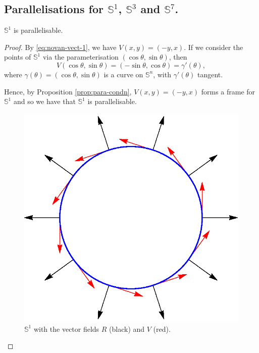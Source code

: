 \documentclass[12pt,a4paper]{article}
\begin{document}
\subsection{Parallelisations for $\mathbb{S}^1$, $\mathbb{S}^3$ and $\mathbb{S}^7$.}
\begin{proposition}
$\mathbb{S}^1$ is parallelisable.
\end{proposition}
\begin{proof}
By \eqref{eq:novan-vect-1}, we have $V(x,y)=(-y,x)$. If we consider the points of $\mathbb{S}^1$ via the parameterisation $(\cos\theta,\sin\theta)$, then
\[
V(\cos\theta,\sin\theta)=(-\sin\theta,\cos\theta)=\gamma'(\theta),
\] 
where $\gamma(\theta)=(\cos\theta,\sin\theta)$ is a curve on $\mathbb{S}^n$, with $\gamma'(\theta)$ tangent.

Hence, by Proposition \ref{prop:para-condn}, $V(x,y)=(-y,x)$ forms a frame for $\mathbb{S}^1$ and so we have that $\mathbb{S}^1$ is parallelisable.

\begin{figure}[h!]
\centering
\includegraphics[scale=0.75]{fig/s1-norm-tang}
\caption{$\mathbb{S}^1$ with the vector fields $R$ (black) and $V$ (red).}
\label{fig:s1+norm+tang}
\end{figure}
\end{proof}
\end{document}
